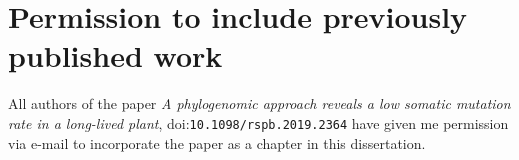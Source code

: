 \chapter{Permission to include previously published work}
\label{ch:permission}
\newpage

All authors of the paper \textit{A phylogenomic approach reveals a low somatic mutation rate in a long-lived plant}, doi:\texttt{10.1098/rspb.2019.2364} have given me permission via e-mail to incorporate the paper as a chapter in this dissertation.
